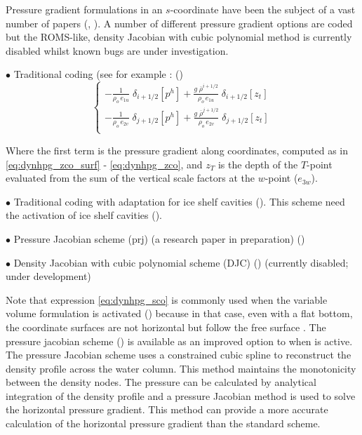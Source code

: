 \documentclass[../main/NEMO_manual]{subfiles}
\begin{document}
Pressure gradient formulations in an $s$-coordinate have been the subject of a vast number of papers
(\eg, \citet{Song1998, Shchepetkin_McWilliams_OM05}). 
A number of different pressure gradient options are coded but the ROMS-like,
density Jacobian with cubic polynomial method is currently disabled whilst known bugs are under investigation.

$\bullet$ Traditional coding (see for example \citet{Madec_al_JPO96}: ()
\begin{equation}
  \label{eq:dynhpg_sco}
  \left\{
    \begin{aligned}
      - \frac{1}    					{\rho_o \, e_{1u}} \;	\delta_{i+1/2} \left[  p^h  \right]
      + \frac{g\; \overline {\rho}^{i+1/2}}	{\rho_o \, e_{1u}} \;	\delta_{i+1/2} \left[  z_t   \right]    \\
      - \frac{1}    					{\rho_o \, e_{2v}} \;	\delta_{j+1/2} \left[  p^h  \right]
      + \frac{g\; \overline {\rho}^{j+1/2}}	{\rho_o \, e_{2v}} \;	\delta_{j+1/2} \left[  z_t   \right]    \\
    \end{aligned}
  \right.
\end{equation} 

Where the first term is the pressure gradient along coordinates,
computed as in \autoref{eq:dynhpg_zco_surf} - \autoref{eq:dynhpg_zco},
and $z_T$ is the depth of the $T$-point evaluated from the sum of the vertical scale factors at the $w$-point 
($e_{3w}$).
 
$\bullet$ Traditional coding with adaptation for ice shelf cavities ().
This scheme need the activation of ice shelf cavities ().

$\bullet$ Pressure Jacobian scheme (prj) (a research paper in preparation) ()

$\bullet$ Density Jacobian with cubic polynomial scheme (DJC) \citep{Shchepetkin_McWilliams_OM05} 
() (currently disabled; under development)

Note that expression \autoref{eq:dynhpg_sco} is commonly used when the variable volume formulation is activated
() because in that case, even with a flat bottom,
the coordinate surfaces are not horizontal but follow the free surface \citep{Levier2007}.
The pressure jacobian scheme () is available as
an improved option to  when  is active.
The pressure Jacobian scheme uses a constrained cubic spline to
reconstruct the density profile across the water column.
This method maintains the monotonicity between the density nodes.
The pressure can be calculated by analytical integration of the density profile and
a pressure Jacobian method is used to solve the horizontal pressure gradient.
This method can provide a more accurate calculation of the horizontal pressure gradient than the standard scheme.
\end{document}
